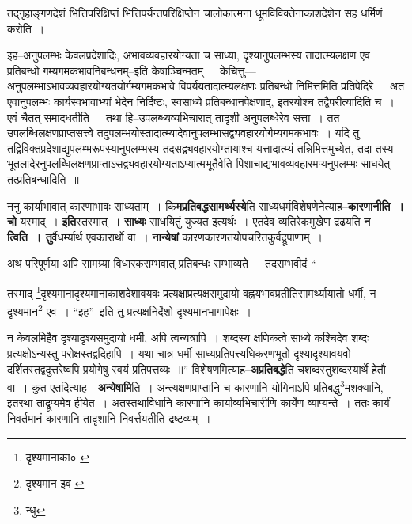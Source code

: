 \documentclass[article,12pt,a4paper]{memoir}
\begin{document}
	  \pstart तद्गृहाङ्गणदेशं भित्तिपरिक्षिप्तं भित्तिपर्यन्तपरिक्षिप्तेन चालोकात्मना धूमविविक्तेनाकाशदेशेन सह धर्मिणं करोति ।
	\pend
      
	  \endgroup
	

	  \pstart इह--अनुपलम्भः केवलप्रदेशादिः, अभावव्यवहारयोग्यता च साध्या, दृश्यानुपलम्भस्य तादात्म्यलक्षण एव प्रतिबन्धो गम्यगमकभावनिबन्धनम्--इति केषाञ्चिन्मतम् । केचित्तु—अनुपलम्भाऽभावव्यवहारयोग्यतयोर्गम्यगमकभावे विपर्ययतादात्म्यलक्षणः प्रतिबन्धो निमित्तमिति प्रतिपेदिरे । अत एवानुपलम्भः कार्यस्वभावाभ्यां भेदेन निर्दिष्टः, स्वसाध्ये प्रतिबन्धानपेक्षणाद्, इतरयोश्च तद्वैपरीत्यादिति च । एवं चैतत् समादधतीति । तथा हि--उपलब्ध्यव्यभिचारात् तादृशी अनुपलब्धेरेव सत्ता । तत उपलब्धिलक्षणप्राप्तसत्त्वे तदुपलम्भयोस्तादात्म्यादेवानुपलम्भासद्व्यवहारयोर्गम्यगमकभावः । यदि तु तद्विविक्तप्रदेशाद्युपलम्भरूपस्यानुपलम्भस्य तदसद्व्यवहारयोग्तायाश्च यत्तादात्म्यं तन्निमित्तमुच्येत, तदा तस्य भूतलादेरनुपलब्धिलक्षणप्राप्ताऽसद्व्यवहारयोग्यताऽप्यात्मभूतैवेति पिशाचाद्यभावव्यवहारमप्यनुपलम्भः साधयेत् तत्प्रतिबन्धादिति ॥
	\pend
      

	  \pstart ननु कार्याभावात् कारणाभावः साध्यताम् । कि\textbf{मप्रतिबद्धसामर्थ्यस्ये}ति साध्यधर्मविशेषणेनेत्याह--\textbf{कारणानीति । चो} यस्माद् । \textbf{इति}स्तस्मात् । \textbf{साध्यः} साधयितुं युज्यत इत्यर्थः । एतदेव व्यतिरेकमुखेण द्रढयति \textbf{न त्विति । तु}र्वैधर्म्यार्थ एवकारार्थो वा । \textbf{नान्येषां} कारणकारणतयोपचरितकुर्वद्रूपाणाम् ।
	\pend
      

	  \pstart अथ परिपूर्णया अपि सामग्र्या विधारकसम्भवात् प्रतिबन्धः सम्भाव्यते । तदसम्भवीदं  \leavevmode{} “
	  
	तस्माद् \footnote{दृश्यमानाका० \cite{dp-msC} \cite{dp-msA}}\-दृश्यमानादृश्यमानाकाशदेशावयवः प्रत्यक्षाप्रत्यक्षसमुदायो वह्नयभावप्रतीतिसामर्थ्यायातो धर्मी, न दृश्यमान\footnote{दृश्यमान इव \cite{dp-msC}} एव । “इह”--इति तु प्रत्यक्षनिर्देशो दृश्यमानभागापेक्षः । 
	  
	न केवलमिहैव दृश्यादृश्यसमुदायो धर्मी, अपि त्वन्यत्रापि । शब्दस्य क्षणिकत्वे साध्ये कश्चिदेव शब्दः प्रत्यक्षोऽन्यस्तु परोक्षस्तद्वदिहापि । यथा चात्र धर्मी साध्यप्रतिपत्त्यधिकरणभूतो दृश्यादृश्यावयवो दर्शितस्तद्वदुत्तरेष्वपि प्रयोगेषु स्वयं प्रतिपत्तव्यः ॥” विशेषणमित्याह--\textbf{अप्रतिबद्धे}ति चशब्दस्तुशब्दस्यार्थे हेतौ वा । कुत एतदित्याह—\textbf{अन्येषामि}ति । अन्त्यक्षणप्राप्तानि च कारणानि योगिनाऽपि प्रतिबद्धु\footnote{न्धु}\-मशक्यानि, इतरथा ताद्रूप्यमेव हीयेत । अतस्तथाविधानि कारणानि कार्याव्यभिचारीणि कार्येण व्याप्यन्ते । ततः कार्यं निवर्तमानं कारणानि तादृशानि निवर्त्तयतीति द्रष्टव्यम् ।
	\pend
      
\end{document}
